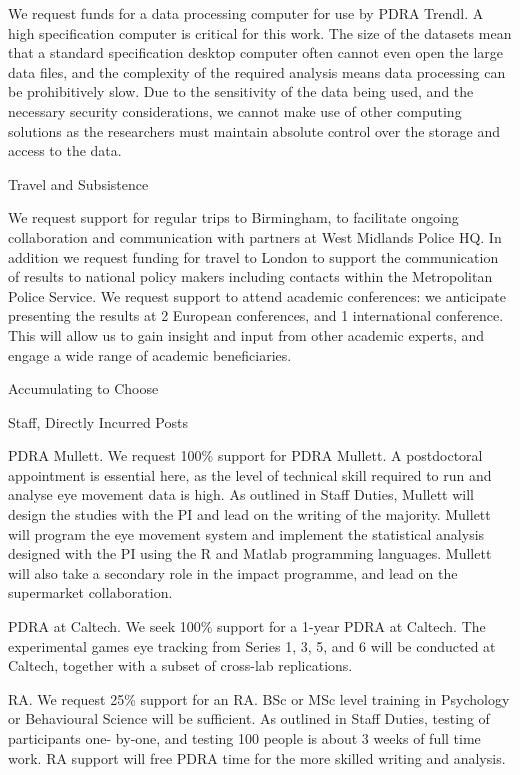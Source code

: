 We request funds for a data processing computer for use by PDRA Trendl. A high specification computer is critical for this work. The size of the datasets mean that a standard specification desktop computer often cannot even open the large data files, and the complexity of the required analysis means data processing can be prohibitively slow. Due to the sensitivity of the data being used, and the necessary security considerations, we cannot make use of other computing solutions as the researchers must maintain absolute control over the storage and access to the data.


Travel and Subsistence

We request support for regular trips to Birmingham, to facilitate ongoing collaboration and communication with partners at West Midlands Police HQ. In addition we request funding for travel to London to support the communication of results to national policy makers including contacts within the Metropolitan Police Service. We request support to attend academic conferences: we anticipate presenting the results at 2 European conferences, and 1 international conference. This will allow us to gain insight and input from other academic experts, and engage a wide range of academic beneficiaries.






Accumulating to Choose

Staff, Directly Incurred Posts

PDRA Mullett. We request 100\% support for PDRA Mullett. A postdoctoral appointment is
essential here, as the level of technical skill required to run and analyse eye movement data is
high. As outlined in Staff Duties, Mullett will design the studies with the PI and lead on the
writing of the majority. Mullett will program the eye movement system and implement the
statistical analysis designed with the PI using the R and Matlab programming languages.
Mullett will also take a secondary role in the impact programme, and lead on the supermarket
collaboration.

PDRA at Caltech. We seek 100\% support for a 1-year PDRA at Caltech. The experimental
games eye tracking from Series 1, 3, 5, and 6 will be conducted at Caltech, together with a
subset of cross-lab replications.

RA. We request 25\% support for an RA. BSc or MSc level training in Psychology or
Behavioural Science will be sufficient. As outlined in Staff Duties, testing of participants one-
by-one, and testing 100 people is about 3 weeks of full time work. RA support will free
PDRA time for the more skilled writing and analysis.

